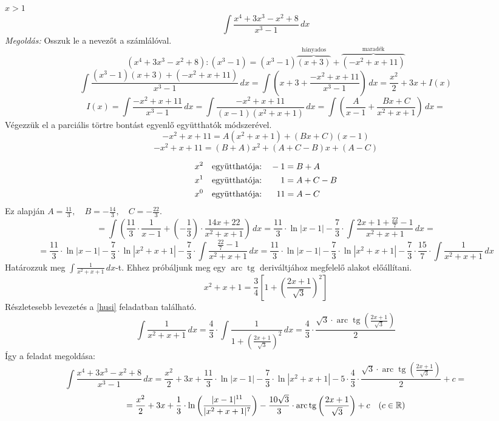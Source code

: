 \documentclass[a4paper,11.5pt]{article}
\DeclareMathOperator{\tg}{tg}
\DeclareMathOperator{\arc}{arc}
\begin{document}
	\begin{exercise}$x>1$
		\[\int\frac{x^4+3x^3-x^2+8}{x^3-1}\,dx  \] 
		\textit{Megoldás:}
		Osszuk le a nevezőt a számlálóval.
		\[ (x^4+3x^3-x^2+8):(x^3-1)=(x^3-1)\overbrace{(x+3)}^{\text{hányados}}+\overbrace{(-x^2+x+11)}^{\text{maradék}} \]
		\[\int\frac{(x^3-1)(x+3)+(-x^2+x+11)}{x^3-1}\,dx=\int\left(x+3+\frac{-x^2+x+11}{x^3-1}\right)\,dx=\frac{x^2}{2}+3x+I(x) \]
		\[ I(x)=\int\frac{-x^2+x+11}{x^3-1}\,dx=\int\frac{-x^2+x+11}{(x-1)(x^2+x+1)}\,dx=\int\left(\frac{A}{x-1}+\frac{Bx+C}{x^2+x+1}\right)\,dx= \]
		Végezzük el a parciális törtre bontást egyenlő együtthatók módszerével.
		\[ -x^2+x+11=A(x^2+x+1)+(Bx+C)(x-1) \]
		\[ -x^2+x+11=(B+A)x^2+(A+C-B)x+(A-C) \]
		
		\vspace{-7mm}
		\begin{align*}
			x^2 \quad \text{együtthatója:}&\quad          -1=B+A\\
			x^1 \quad \text{együtthatója:}&\hspace{7.8mm}  1=A+C-B\\
			x^0 \quad \text{együtthatója:}&\hspace{6.1mm}  11=A-C
		\end{align*}
		Ez alapján $A= \frac{11}{3},\quad B=-\frac{14}{3},\quad C=-\frac{22}{3}.$
		\[=\int\left(\frac{11}{3}\cdot\frac{1}{x-1}+\left(-\frac{1}{3}\right)\cdot\frac{14x+22}{x^2+x+1}\right)\,dx=\frac{11}{3}\cdot\ln|x-1|-\frac{7}{3}\cdot\int\frac{2x+1+\frac{22}{7}-1}{x^2+x+1}\,dx= \]
		\[ =\frac{11}{3}\cdot\ln|x-1|-\frac{7}{3}\cdot\ln|x^2+x+1|-\frac{7}{3}\cdot\int\frac{\frac{22}{7}-1}{x^2+x+1}\,dx=\frac{11}{3}\cdot\ln|x-1|-\frac{7}{3}\cdot\ln|x^2+x+1|-\frac{7}{3}\cdot\frac{15}{7}\cdot\int\frac{1}{x^2+x+1}\,dx \]
		Határozzuk meg $\int\frac{1}{x^2+x+1}\,dx$-t. Ehhez próbáljunk meg egy $\arc\tg$ deriváltjához megfelelő alakot előállítani.
		\[ x^2+x+1=\frac{3}{4}\left[1+\left(\frac{2x+1}{\sqrt{3}}\right)^2\right] \]
		Részletesebb levezetés a \ref{husi} feladatban található.
		\[ \int\frac{1}{x^2+x+1}\,dx=\frac{4}{3}\cdot\int\frac{1}{1+\left(\frac{2x+1}{\sqrt{3}}\right)^2}\,dx=\frac{4}{3}\cdot\frac{\sqrt{3}\cdot\arc\tg\left(\frac{2x+1}{\sqrt{3}}\right)}{2}  \]
		Így a feladat megoldása:
		\[ \int\frac{x^4+3x^3-x^2+8}{x^3-1}\,dx =\frac{x^2}{2}+3x+ \frac{11}{3}\cdot\ln|x-1|-\frac{7}{3}\cdot\ln|x^2+x+1|-5\cdot\frac{4}{3}\cdot\frac{\sqrt{3}\cdot\arc\tg\left(\frac{2x+1}{\sqrt{3}}\right)}{2}+c= \]
		\[=\frac{x^2}{2}+3x+ \frac{1}{3}\cdot\ln\left(\frac{|x-1|^{11}}{|x^2+x+1|^7}\right)-\frac{10\sqrt{3}}{3}\cdot\arc\tg\left(\frac{2x+1}{\sqrt{3}}\right)+c\quad (c\in\R)\]
	\end{exercise}
\end{document}
